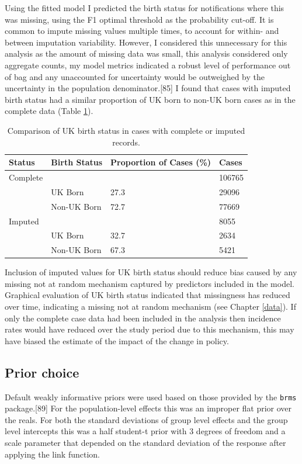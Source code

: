 \documentclass[11pt,twoside]{bristolthesis}
\begin{document}
  Using the fitted model I predicted the birth status for notifications where this was missing, using the F1 optimal threshold as the probability cut-off. It is common to impute missing values multiple times, to account for within- and between imputation variability. However, I considered this unnecessary for this analysis as the amount of missing data was small, this analysis considered only aggregate counts, my model metrics indicated a robust level of performance out of bag and any unaccounted for uncertainty would be outweighed by the uncertainty in the population denominator.{[}85{]} I found that cases with imputed birth status had a similar proportion of UK born to non-UK born cases as in the complete data (Table \ref{tab:07-imp-com}).
  \begin{table}[!h]
  
  \caption{\label{tab:07-imp-com}Comparison of UK birth status in cases with complete or imputed records.}
  \centering
  \begin{tabular}{llll}
  \toprule
  Status & Birth Status & Proportion of Cases (\%) & Cases\\
  \midrule
  Complete &  &  & 106765\\
   & UK Born & 27.3 & 29096\\
   & Non-UK Born & 72.7 & 77669\\
  Imputed &  &  & 8055\\
   & UK Born & 32.7 & 2634\\
  \addlinespace
   & Non-UK Born & 67.3 & 5421\\
  \bottomrule
  \end{tabular}
  \end{table}
  Inclusion of imputed values for UK birth status should reduce bias caused by any missing not at random mechanism captured by predictors included in the model. Graphical evaluation of UK birth status indicated that missingness has reduced over time, indicating a missing not at random mechanism (see Chapter \ref{data}). If only the complete case data had been included in the analysis then incidence rates would have reduced over the study period due to this mechanism, this may have biased the estimate of the impact of the change in policy.
  
  \hypertarget{prior-choice}{%
  \subsection{Prior choice}\label{prior-choice}}
  
  Default weakly informative priors were used based on those provided by the \texttt{brms} package.{[}89{]} For the population-level effects this was an improper flat prior over the reals. For both the standard deviations of group level effects and the group level intercepts this was a half student-t prior with 3 degrees of freedom and a scale parameter that depended on the standard deviation of the response after applying the link function.
  
\end{document}
